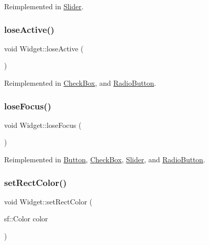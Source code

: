 Reimplemented in \mbox{\hyperlink{class_slider_a43bb29d29c19b4f0838462a18896660c}{Slider}}.

\mbox{\label{class_widget_a8d15d94eb8e41a82e9c4c0ee70a449b6}} 
\subsubsection{\texorpdfstring{loseActive()}{loseActive()}}
{\footnotesize\ttfamily void Widget\+::lose\+Active (\begin{DoxyParamCaption}{ }\end{DoxyParamCaption})\hspace{0.3cm}{\ttfamily [virtual]}}



Reimplemented in \mbox{\hyperlink{class_check_box_aa4eb44d9c99f24b566233ec7d0504808}{Check\+Box}}, and \mbox{\hyperlink{class_radio_button_a2a2c14c31db623a8cbe71dd82b12e01b}{Radio\+Button}}.

\mbox{\label{class_widget_a038576de7f1adf6b29f3ebfd3515f13f}} 
\subsubsection{\texorpdfstring{loseFocus()}{loseFocus()}}
{\footnotesize\ttfamily void Widget\+::lose\+Focus (\begin{DoxyParamCaption}{ }\end{DoxyParamCaption})\hspace{0.3cm}{\ttfamily [virtual]}}



Reimplemented in \mbox{\hyperlink{class_button_a3b3550244cdb94552631a4582f4d0120}{Button}}, \mbox{\hyperlink{class_check_box_a071873f266cc4b88eb077bc7d0ec7524}{Check\+Box}}, \mbox{\hyperlink{class_slider_aae708de41200e777a10c9cc6d9834ce5}{Slider}}, and \mbox{\hyperlink{class_radio_button_a5cc3b7a4eb1a2ac7aead0cf4a589baca}{Radio\+Button}}.

\mbox{\label{class_widget_a44295ab8e8a07e8206790dd6b317d2fe}} 
\subsubsection{\texorpdfstring{setRectColor()}{setRectColor()}}
{\footnotesize\ttfamily void Widget\+::set\+Rect\+Color (\begin{DoxyParamCaption}\item[{sf\+::\+Color}]{color }\end{DoxyParamCaption})\hspace{0.3cm}{\ttfamily [virtual]}}



